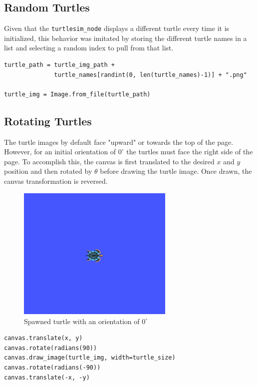     \subsection{Random Turtles}
        Given that the \texttt{turtlesim\_node} displays a different turtle every time it is initialized, this behavior was imitated by storing the different turtle names in a list and selecting a random index to pull from that list.
        
        \begin{lstlisting}
turtle_path = turtle_img_path + 
              turtle_names[randint(0, len(turtle_names)-1)] + ".png"

turtle_img = Image.from_file(turtle_path)
        \end{lstlisting}
    
    \subsection{Rotating Turtles}
        
        The turtle images by default face "upward" or towards the top of the page. However, for an initial orientation of $0^\circ$ the turtles must face the right side of the page. To accomplish this, the canvas is first translated to the desired $x$ and $y$ position and then rotated by $\theta$ before drawing the turtle image. Once drawn, the canvas transformation is reversed.
        
        \begin{figure}[hb]
            \centering
            \includegraphics[width=7.5cm]{Images/01_spawn.jpg}
            \caption{Spawned turtle with an orientation of $0^\circ$}
            \label{fig:spawnTurtle}
        \end{figure}
    
        \begin{lstlisting}
canvas.translate(x, y)
canvas.rotate(radians(90))
canvas.draw_image(turtle_img, width=turtle_size)
canvas.rotate(radians(-90))
canvas.translate(-x, -y)
        \end{lstlisting}
        

